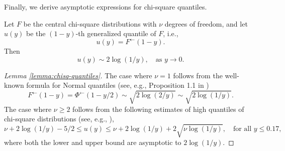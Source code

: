 Finally, we derive asymptotic expressions for  chi-square quantiles.

\begin{lemma} \label{lemma:chisq-quantiles}
Let $F$ be the central chi-square distributions with $\nu$ degrees of freedom, and let $u(y)$ be the $(1-y)$-th generalized quantile of $F$, i.e.,
\begin{equation} \label{eq:quantiles-generic}
    u(y) = F^\leftarrow(1 - y).
\end{equation}
Then 
\begin{equation}
    u(y) \sim 2\log(1/y), \quad \text{as }y\to0. 
\end{equation}
\end{lemma}

\begin{proof}[Lemma \ref{lemma:chisq-quantiles}]
The case where $\nu=1$ follows from the well-known formula for Normal quantiles (see, e.g., Proposition 1.1 in \cite{gao2018fundamental})
$$
F^\leftarrow(1 - y) = \Phi^\leftarrow(1-y/2)\sim\sqrt{2\log{(2/y)}}\sim\sqrt{2\log{(1/y)}}.
$$
The case where $\nu\ge2$ follows from the following estimates of high quantiles of chi-square distributions (see, e.g., \citep{inglot2010inequalities}),
$$
    \nu +  2\log(1/y) -5/2 \le u(y) \le \nu +  2\log(1/y) + 2\sqrt{\nu\log(1/y)}, \quad \text{for all }y\le0.17,
$$
where both the lower and upper bound are asymptotic to $2\log(1/y)$.
\end{proof}

